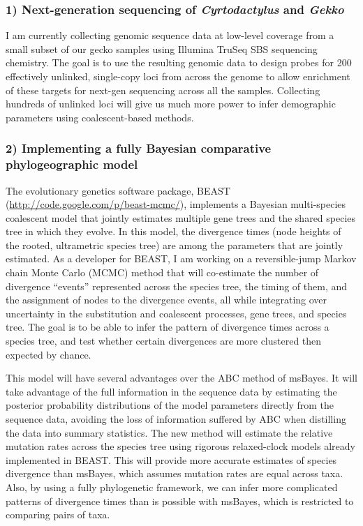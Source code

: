 \documentclass[10pt]{article}
\begin{document}
\subsubsection*{1) Next-generation sequencing of \emph{Cyrtodactylus} and \emph{Gekko}}
I am currently collecting genomic sequence data at low-level coverage from a small subset of our gecko samples using Illumina TruSeq SBS sequencing chemistry.
The goal is to use the resulting genomic data to design probes for 200 effectively unlinked, single-copy loci from across the genome to allow enrichment of these targets for next-gen sequencing across all the samples.
Collecting hundreds of unlinked loci will give us much more power to infer demographic parameters using coalescent-based methods.

\subsubsection*{2) Implementing a fully Bayesian comparative phylogeographic model}
The evolutionary genetics software package, BEAST (\url{http://code.google.com/p/beast-mcmc/}), implements a Bayesian multi-species coalescent model that jointly estimates multiple gene trees and the shared species tree in which they evolve.
In this model, the divergence times (node heights of the rooted, ultrametric species tree) are among the parameters that are jointly estimated.
As a developer for BEAST, I am working on a reversible-jump Markov chain Monte Carlo (MCMC) method that will co-estimate the number of divergence ``events'' represented across the species tree, the timing of them, and the assignment of nodes to the divergence events, all while integrating over uncertainty in the substitution and coalescent processes, gene trees, and species tree.
The goal is to be able to infer the pattern of divergence times across a species tree, and test whether certain divergences are more clustered then expected by chance.

This model will have several advantages over the ABC method of msBayes.
It will take advantage of the full information in the sequence data by estimating the posterior probability distributions of the model parameters directly from the sequence data, avoiding the loss of information suffered by ABC when distilling the data into summary statistics.
The new method will estimate the relative mutation rates across the species tree using rigorous relaxed-clock models already implemented in BEAST.
This will provide more accurate estimates of species divergence than msBayes, which assumes mutation rates are equal across taxa.
Also, by using a fully phylogenetic framework, we can infer more complicated patterns of divergence times than is possible with msBayes, which is restricted to comparing pairs of taxa.
\end{document}

